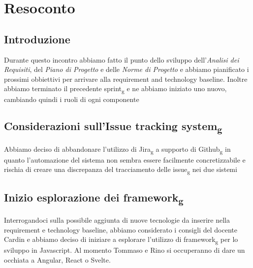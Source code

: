 \section{Resoconto}
\subsection{Introduzione}
Durante questo incontro abbiamo fatto il punto dello sviluppo dell'\textit{Analisi dei Requisiti}, del \textit{Piano di Progetto} e delle \textit{Norme di Progetto} e abbiamo pianificato i prossimi obbiettivi per arrivare alla requirement and technology baseline. Inoltre abbiamo terminato il precedente sprint\textsubscript{g} e ne abbiamo iniziato uno nuovo, cambiando quindi i ruoli di ogni componente

\subsection{Considerazioni sull'Issue tracking system\textsubscript{g}}
Abbiamo deciso di abbandonare l'utilizzo di Jira\textsubscript{g} a supporto di Github\textsubscript{g} in quanto l'automazione del sistema non sembra essere facilmente concretizzabile e rischia di creare una discrepanza del tracciamento delle issue\textsubscript{g} nei due sistemi

\subsection{Inizio esplorazione dei framework\textsubscript{g}}
Interrogandoci sulla possibile aggiunta di nuove tecnologie da inserire nella requirement e technology baseline, abbiamo considerato i consigli del docente Cardin e abbiamo deciso di iniziare a esplorare l'utilizzo di framework\textsubscript{g} per lo sviluppo in Javascript. Al momento Tommaso e Rino si occuperanno di dare un occhiata a Angular, React o Svelte.


